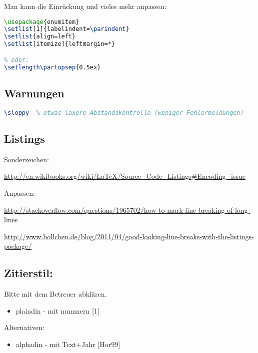 Man kann die Einrückung und vieles mehr anpassen:

\begin{lstlisting}[language=TeX]
\usepackage{enumitem}
\setlist[1]{labelindent=\parindent}
\setlist{align=left}
\setlist[itemize]{leftmargin=*}

% oder: 
\setlength\partopsep{0.5ex}
\end{lstlisting}

\hypertarget{warnungen}{%
\subsection{Warnungen}\label{warnungen}}

\begin{lstlisting}[language=TeX]
\sloppy  % etwas laxere Abstandskontrolle (weniger Fehlermeldungen)
\end{lstlisting}

\hypertarget{listings}{%
\subsection{Listings}\label{listings}}

Sonderzeichen:

\url{http://en.wikibooks.org/wiki/LaTeX/Source_Code_Listings\#Encoding_issue}

Anpassen:

\url{http://stackoverflow.com/questions/1965702/how-to-mark-line-breaking-of-long-lines}

\url{http://www.bollchen.de/blog/2011/04/good-looking-line-breaks-with-the-listings-package/}

\hypertarget{zitierstil}{%
\subsection{Zitierstil:}\label{zitierstil}}

Bitte mit dem Betreuer abklären.

\begin{itemize}
\tightlist
\item
  plaindin - mit nummern {[}1{]}
\end{itemize}

Alternativen:

\begin{itemize}
\tightlist
\item
  alphadin - mit Text+Jahr {[}Hor99{]}
\end{itemize}

